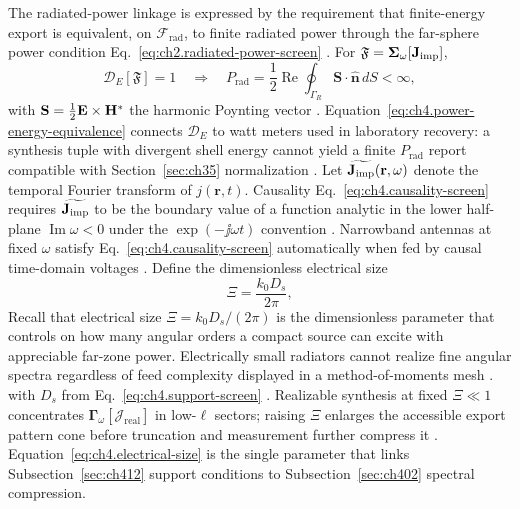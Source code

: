 The radiated-power linkage is expressed by the requirement that finite-energy export is equivalent, on \(\mathcal{F}_{\mathrm{rad}}\), to finite radiated power through the
far-sphere power condition Eq.~\eqref{eq:ch2.radiated-power-screen} \cite{stratton1941}. For
\(\mathfrak{F}=\boldsymbol{\Sigma}_\omega[\mathbf{J}_{\mathrm{imp}}]\),
\begin{equation}
\label{eq:ch4.power-energy-equivalence}
\mathcal{D}_{E}[\mathfrak{F}]=1
\quad\Longrightarrow\quad
P_{\mathrm{rad}}
=
\frac{1}{2}\operatorname{Re}\!\oint_{\Gamma_{R}}
\mathbf{S}\cdot\hat{\mathbf{n}}\,dS
<
\infty,
\end{equation}
with \(\mathbf{S}=\tfrac{1}{2}\mathbf{E}\times\mathbf{H}^{*}\) the harmonic Poynting vector \cite{poynting1884}.
Equation~\eqref{eq:ch4.power-energy-equivalence} connects \(\mathcal{D}_{E}\) to watt meters used in
laboratory recovery: a synthesis tuple with divergent shell energy cannot yield a finite \(P_{\mathrm{rad}}\)
report compatible with Section~\ref{sec:ch35} normalization \cite{hansen1988}.
Let \(\widetilde{\mathbf{J}_{\mathrm{imp}}}(\mathbf{r},\omega)\) denote the temporal Fourier transform of \(j(\mathbf{r},t)\). Causality
Eq.~\eqref{eq:ch4.causality-screen} requires \(\widetilde{\mathbf{J}_{\mathrm{imp}}}\) to be the boundary value of a function analytic
in the lower half-plane \(\operatorname{Im}\omega<0\) under the \(\exp(-\jj\omega t)\) convention
\cite{stratton1941}. Narrowband
antennas at fixed \(\omega\) satisfy Eq.~\eqref{eq:ch4.causality-screen} automatically when fed by causal
time-domain voltages \cite{collin2001}.
Define the dimensionless electrical size
\begin{equation}
\label{eq:ch4.electrical-size}
\Xi
=
\frac{k_{0}D_{s}}{2\pi},
\end{equation}
Recall that electrical size $\Xi=k_0 D_s/(2\pi)$ is the dimensionless parameter that controls on how many angular orders a compact source can excite with appreciable far-zone power. Electrically small radiators cannot realize fine angular spectra regardless of feed complexity displayed in a method-of-moments mesh \cite{chu1948}.
with \(D_{s}\) from Eq.~\eqref{eq:ch4.support-screen} \cite{stratton1941}. Realizable synthesis at
fixed \(\Xi\ll1\) concentrates \(\boldsymbol{\Gamma}_\omega[\mathcal{J}_{\mathrm{real}}]\) in low-\(\ell\) sectors;
raising \(\Xi\) enlarges the accessible export pattern cone before truncation and measurement further compress it
\cite{hansen1988}. Equation~\eqref{eq:ch4.electrical-size} is the single parameter that links
Subsection~\ref{sec:ch412} support conditions to Subsection~\ref{sec:ch402} spectral compression.

